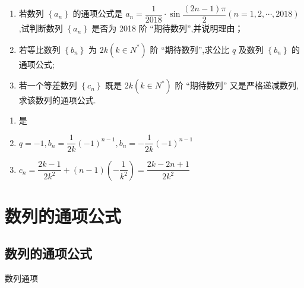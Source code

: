 \begin{enumerate}
    \begin{enumerate}
        \item 若数列 $\left\{  {a}_{n}\right\}$ 的通项公式是 ${a}_{n} = \dfrac{1}{2018} \cdot  \sin \dfrac{\left( {{2n} - 1}\right) \pi }{2}\left( {n = 1,2,\cdots ,{2018}}\right)$ ,试判断数列 $\left\{  {a}_{n}\right\}$ 是否为 2018 阶 “期待数列”,并说明理由；
        \item 若等比数列 $\left\{  {b}_{n}\right\}$ 为 ${2k}\left( {k \in  {N}^{ * }}\right)$ 阶 “期待数列”,求公比 $q$ 及数列 $\left\{  {b}_{n}\right\}$ 的通项公式;
        \item 若一个等差数列 $\left\{  {c}_{n}\right\}$ 既是 ${2k}\left( {k \in  {N}^{ * }}\right)$ 阶 “期待数列” 又是严格递减数列,求该数列的通项公式.
    \end{enumerate}
    \begin{jieda}
        \begin{enumerate}
            \item 是
            \item $q = -1, b_n = \dfrac{1}{2k}(-1)^{n-1}, b_n = -\dfrac{1}{2k}(-1)^{n-1}$
            \item $c_n = \dfrac{2k-1}{2k^2} + (n-1)\left(-\dfrac{1}{k^2}\right) = \dfrac{2k-2n+1}{2k^2}$
        \end{enumerate}
    \end{jieda}
    
\end{enumerate}


\section*{数列的通项公式}
\subsection*{数列的通项公式}
\zsd 数列通项

